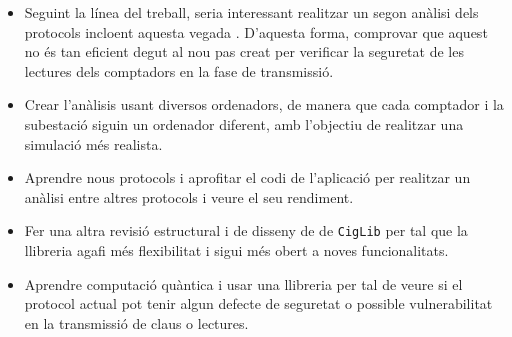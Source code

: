 \begin{itemize}
	\item Seguint la línea del treball, seria interessant realitzar un segon anàlisi dels protocols incloent aquesta vegada \cite{repair-busom}. D'aquesta forma, comprovar que aquest no és tan eficient degut al nou pas creat per verificar la seguretat de les lectures dels comptadors en la fase de transmissió.
	\item Crear l'anàlisis usant diversos ordenadors, de manera que cada comptador i la subestació siguin un ordenador diferent, amb l'objectiu de realitzar una simulació més realista.
	\item Aprendre nous protocols i aprofitar el codi de l'aplicació per realitzar un anàlisi entre altres protocols i veure el seu rendiment.
	\item Fer una altra revisió estructural i de disseny de de \texttt{CigLib} per tal que la llibreria agafi més flexibilitat i sigui més obert a noves funcionalitats.
	\item Aprendre computació quàntica i usar una llibreria per tal de veure si el protocol actual pot tenir algun defecte de seguretat o possible vulnerabilitat en la transmissió de claus o lectures.
\end{itemize}
